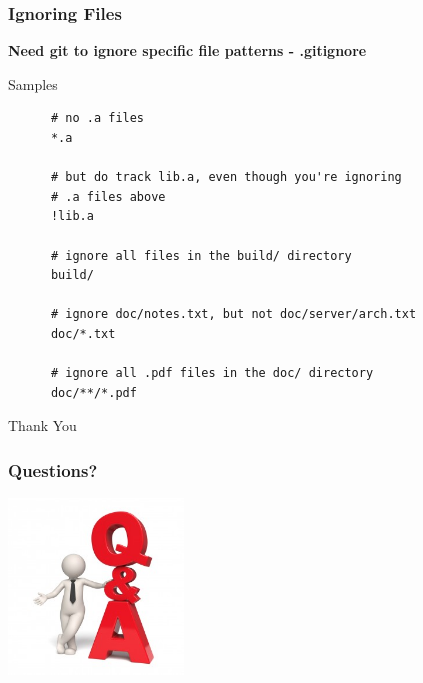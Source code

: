 \documentclass[10pt]{beamer}
\begin{document}
\begin{frame}[fragile]
  \frametitle{Ignoring Files}
  \textbf{Need git to ignore specific file patterns - .gitignore}
  \medskip
  \begin{block}{Samples}
    \begin{verbatim}
      # no .a files
      *.a

      # but do track lib.a, even though you're ignoring
      # .a files above
      !lib.a

      # ignore all files in the build/ directory
      build/

      # ignore doc/notes.txt, but not doc/server/arch.txt
      doc/*.txt

      # ignore all .pdf files in the doc/ directory
      doc/**/*.pdf
    \end{verbatim}
  \end{block}
  \medskip
\end{frame}

\begin{frame}
  \begin{center}
    \Huge{Thank You}
  \end{center}
\end{frame}

\begin{frame}
	\frametitle{Questions?}
	\begin{center}
	\includegraphics[width=0.35\textwidth]{q2.jpg}
	\end{center}
\end{frame}

\end{document}
